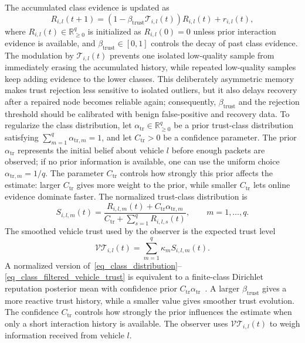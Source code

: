 \documentclass[letterpaper,journal]{IEEEtran}
\def\VT{\mathcal{VT}} %
\def\T{\mathcal{T}} %
\begin{document}
The accumulated class evidence is updated as
\begin{equation}
    R_{i,l}(t+1)=
    \left(1-\beta_{\text{trust}}\T_{i,l}(t)\right)R_{i,l}(t)
    +r_{i,l}(t),
    \label{eq_class_history_update}
\end{equation}
where $R_{i,l}(t)\in\mathbb{R}_{\ge0}^{q}$ is initialized as $R_{i,l}(0)=0$ unless prior interaction evidence is available, and $\beta_{\text{trust}}\in[0,1]$ controls the decay of past class evidence.
The modulation by $\T_{i,l}(t)$ prevents one isolated low-quality sample from immediately erasing the accumulated history, while repeated low-quality samples keep adding evidence to the lower classes. This deliberately asymmetric memory makes trust rejection less sensitive to isolated outliers, but it also delays recovery after a repaired node becomes reliable again; consequently, $\beta_{\text{trust}}$ and the rejection threshold should be calibrated with benign false-positive and recovery data.
To regularize the class distribution, let $\alpha_{\mathrm{tr}}\in\mathbb{R}_{\ge0}^{q}$ be a prior trust-class distribution satisfying $\sum_{m=1}^{q}\alpha_{\mathrm{tr},m}=1$, and let $C_{\mathrm{tr}}>0$ be a confidence parameter.
The prior $\alpha_{\mathrm{tr}}$ represents the initial belief about vehicle $l$ before enough packets are observed; if no prior information is available, one can use the uniform choice $\alpha_{\mathrm{tr},m}=1/q$.
The parameter $C_{\mathrm{tr}}$ controls how strongly this prior affects the estimate: larger $C_{\mathrm{tr}}$ gives more weight to the prior, while smaller $C_{\mathrm{tr}}$ lets online evidence dominate faster.
The normalized trust-class distribution is
\begin{equation}
    S_{i,l,m}(t)=
    \frac{R_{i,l,m}(t)+C_{\mathrm{tr}}\alpha_{\mathrm{tr},m}}
    {C_{\mathrm{tr}}+\sum_{s=1}^{q}R_{i,l,s}(t)},
    \qquad m=1,\ldots,q.
    \label{eq_class_distribution}
\end{equation}
The smoothed vehicle trust used by the observer is the expected trust level
\begin{equation}
    \VT_{i,l}(t)=
    \sum_{m=1}^{q}\kappa_m S_{i,l,m}(t).
    \label{eq_class_filtered_vehicle_trust}
\end{equation}
A normalized version of~\eqref{eq_class_distribution}--\eqref{eq_class_filtered_vehicle_trust} is equivalent to a finite-class Dirichlet reputation posterior mean with confidence prior $C_{\mathrm{tr}}\alpha_{\mathrm{tr}}$~\cite{josang2007dirichlet}.
A larger $\beta_{\text{trust}}$ gives a more reactive trust history, while a smaller value gives smoother trust evolution.
The confidence $C_{\mathrm{tr}}$ controls how strongly the prior influences the estimate when only a short interaction history is available.
The observer uses $\VT_{i,l}(t)$ to weigh information received from vehicle $l$.
\end{document}
